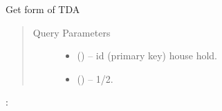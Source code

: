 \documentclass[letterpaper,10pt,english,openany,oneside]{sphinxmanual}
\begin{document}
\begin{fulllineitems}
\label{\detokenize{api-last-mile/v1:get--api-last-smile-v1-TDA-form}}
\sphinxAtStartPar
Get form of TDA
\begin{quote}\begin{description}
\item[{Query Parameters}] \leavevmode\begin{itemize}
\item {} 
\sphinxAtStartPar
{} () – id (primary key) house hold.

\item {} 
\sphinxAtStartPar
{} () – 1/2.

\end{itemize}

\end{description}\end{quote}

\sphinxAtStartPar
{}:


\end{fulllineitems}
\end{document}

